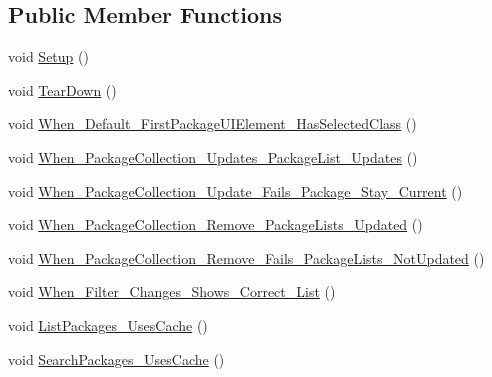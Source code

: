 \subsection*{Public Member Functions}
\begin{DoxyCompactItemize}
\item 
void \mbox{\hyperlink{class_unity_editor_1_1_package_manager_1_1_u_i_1_1_tests_1_1_package_manager_window_tests_ad0ad24cd1a0baf37359c9e1b6737fcd0}{Setup}} ()
\item 
void \mbox{\hyperlink{class_unity_editor_1_1_package_manager_1_1_u_i_1_1_tests_1_1_package_manager_window_tests_ad620512957ff2f08d758b2e5e98a1b99}{Tear\+Down}} ()
\item 
void \mbox{\hyperlink{class_unity_editor_1_1_package_manager_1_1_u_i_1_1_tests_1_1_package_manager_window_tests_a245beeb834f41f5fe9cd79d5f7e6910f}{When\+\_\+\+Default\+\_\+\+First\+Package\+U\+I\+Element\+\_\+\+Has\+Selected\+Class}} ()
\item 
void \mbox{\hyperlink{class_unity_editor_1_1_package_manager_1_1_u_i_1_1_tests_1_1_package_manager_window_tests_a068dabc7b2d879a8c66c70395b38db3d}{When\+\_\+\+Package\+Collection\+\_\+\+Updates\+\_\+\+Package\+List\+\_\+\+Updates}} ()
\item 
void \mbox{\hyperlink{class_unity_editor_1_1_package_manager_1_1_u_i_1_1_tests_1_1_package_manager_window_tests_abc176b6b86e14738c960b6ce51742a1a}{When\+\_\+\+Package\+Collection\+\_\+\+Update\+\_\+\+Fails\+\_\+\+Package\+\_\+\+Stay\+\_\+\+Current}} ()
\item 
void \mbox{\hyperlink{class_unity_editor_1_1_package_manager_1_1_u_i_1_1_tests_1_1_package_manager_window_tests_a818e9d20a154f1b47ed7a3cfca9375c9}{When\+\_\+\+Package\+Collection\+\_\+\+Remove\+\_\+\+Package\+Lists\+\_\+\+Updated}} ()
\item 
void \mbox{\hyperlink{class_unity_editor_1_1_package_manager_1_1_u_i_1_1_tests_1_1_package_manager_window_tests_a43491762dcc44e54c39bf1e83923a320}{When\+\_\+\+Package\+Collection\+\_\+\+Remove\+\_\+\+Fails\+\_\+\+Package\+Lists\+\_\+\+Not\+Updated}} ()
\item 
void \mbox{\hyperlink{class_unity_editor_1_1_package_manager_1_1_u_i_1_1_tests_1_1_package_manager_window_tests_ad2459ae2e6a2270c6dc40bc69d98502a}{When\+\_\+\+Filter\+\_\+\+Changes\+\_\+\+Shows\+\_\+\+Correct\+\_\+\+List}} ()
\item 
void \mbox{\hyperlink{class_unity_editor_1_1_package_manager_1_1_u_i_1_1_tests_1_1_package_manager_window_tests_a046446c91e9836804c13619064db4f77}{List\+Packages\+\_\+\+Uses\+Cache}} ()
\item 
void \mbox{\hyperlink{class_unity_editor_1_1_package_manager_1_1_u_i_1_1_tests_1_1_package_manager_window_tests_aab7c5110bc86eb18b1f4ef9da267ce59}{Search\+Packages\+\_\+\+Uses\+Cache}} ()
\end{DoxyCompactItemize}
